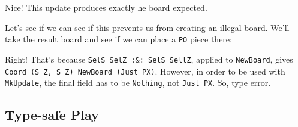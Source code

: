 \documentclass[]{article}
\newenvironment{Shaded}{}{}
\newcommand{\DataTypeTok}[1]{\textcolor[rgb]{0.56,0.13,0.00}{#1}}
\newcommand{\KeywordTok}[1]{\textcolor[rgb]{0.00,0.44,0.13}{\textbf{#1}}}
\newcommand{\NormalTok}[1]{#1}
\newcommand{\OperatorTok}[1]{\textcolor[rgb]{0.40,0.40,0.40}{#1}}
\newcommand{\OtherTok}[1]{\textcolor[rgb]{0.00,0.44,0.13}{#1}}
\begin{document}
Nice! This update produces exactly he board expected.

Let's see if we can see if this prevents us from creating an illegal board.
We'll take the result board and see if we can place a \texttt{PO} piece there:

\begin{Shaded}
\end{Shaded}

Right! That's because \texttt{SelS\ SelZ\ :\&:\ SelS\ SellZ}, applied to
\texttt{NewBoard}, gives
\texttt{Coord\ \textquotesingle{}(\textquotesingle{}S\ \textquotesingle{}Z,\ \textquotesingle{}S\ \textquotesingle{}Z)\ NewBoard\ (\textquotesingle{}Just\ \textquotesingle{}PX)}.
However, in order to be used with \texttt{MkUpdate}, the final field has to be
\texttt{\textquotesingle{}Nothing}, not
\texttt{\textquotesingle{}Just\ \textquotesingle{}PX}. So, type error.

\subsection{Type-safe Play}\label{type-safe-play}
\end{document}
